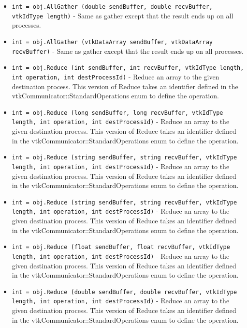 \begin{itemize}
\item  \verb|int = obj.AllGather (double sendBuffer, double recvBuffer, vtkIdType length)| -  Same as gather except that the result ends up on all processes.

\item  \verb|int = obj.AllGather (vtkDataArray sendBuffer, vtkDataArray recvBuffer)| -  Same as gather except that the result ends up on all processes.

\item  \verb|int = obj.Reduce (int sendBuffer, int recvBuffer, vtkIdType length, int operation, int destProcessId)| -  Reduce an array to the given destination process.  This version of Reduce
 takes an identifier defined in the
 vtkCommunicator::StandardOperations enum to define the operation.

\item  \verb|int = obj.Reduce (long sendBuffer, long recvBuffer, vtkIdType length, int operation, int destProcessId)| -  Reduce an array to the given destination process.  This version of Reduce
 takes an identifier defined in the
 vtkCommunicator::StandardOperations enum to define the operation.

\item  \verb|int = obj.Reduce (string sendBuffer, string recvBuffer, vtkIdType length, int operation, int destProcessId)| -  Reduce an array to the given destination process.  This version of Reduce
 takes an identifier defined in the
 vtkCommunicator::StandardOperations enum to define the operation.

\item  \verb|int = obj.Reduce (string sendBuffer, string recvBuffer, vtkIdType length, int operation, int destProcessId)| -  Reduce an array to the given destination process.  This version of Reduce
 takes an identifier defined in the
 vtkCommunicator::StandardOperations enum to define the operation.

\item  \verb|int = obj.Reduce (float sendBuffer, float recvBuffer, vtkIdType length, int operation, int destProcessId)| -  Reduce an array to the given destination process.  This version of Reduce
 takes an identifier defined in the
 vtkCommunicator::StandardOperations enum to define the operation.

\item  \verb|int = obj.Reduce (double sendBuffer, double recvBuffer, vtkIdType length, int operation, int destProcessId)| -  Reduce an array to the given destination process.  This version of Reduce
 takes an identifier defined in the
 vtkCommunicator::StandardOperations enum to define the operation.


\end{itemize}
